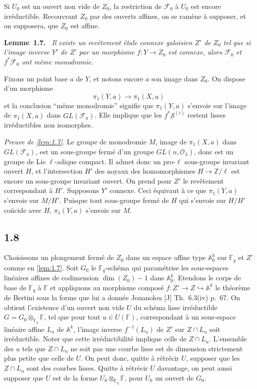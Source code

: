 \documentclass[10pt,a4paper]{article}
\makeatletter
\theoremstyle{plain}
\theoremstyle{definition}
\newenvironment{manualblock}[4]{%
  \par\medskip\noindent\textbf{#1~#2#3.}\def\@currentlabel{#2}\label{#4}\itshape\ }{\par\normalfont\medskip}
\makeatother
\begin{document}
Si $U_0$ est un ouvert non vide de $Z_0$, la restriction de $\mathcal{F}_0$ \`a $U_0$ est encore irr\'eductible. Recouvrant $Z_0$ par des ouverts affines, on se ram\`ene \`a supposer, et on supposera, que $Z_0$ est affine.

\begin{manualblock}{Lemme}{1.7}{}{lem:1.7}
Il existe un rev\^etement \'etale connexe galoisien $Z'$ de $Z_0$ tel que si l'image inverse $Y'$ de $Z'$ par un morphisme $f: Y \to Z_0$ est connexe, alors $\mathcal{F}_0$ et $f^* \mathcal{F}_0$ ont m\^eme monodromie.
\end{manualblock}

Fixons un point base $a$ de $Y$, et notons encore $a$ son image dans $Z_0$. On dispose d'un morphisme
\[
\pi_1(Y,a) \to \pi_1(X,a)
\]
et la conclusion ``m\^eme monodromie'' signifie que $\pi_1(Y,a)$ s'envoie sur l'image de $\pi_1(X,a)$ dans $GL(\mathcal{F}_a)$. Elle implique que les $f^* \mathcal{S}^{(i)}$ restent lisses irr\'eductibles non isomorphes.

\noindent\textit{Preuve de \ref{lem:1.7}.} Le groupe de monodromie $M$, image de $\pi_1(X,a)$ dans $GL(\mathcal{F}_a)$, est un sous-groupe ferm\'e d'un groupe $GL(n, \mathcal{O}_\lambda)$, donc est un groupe de Lie $\ell$-adique compact. Il admet donc un pro-$\ell$ sous-groupe invariant ouvert $H$, et l'intersection $H'$ des noyaux des homomorphismes $H \to \mathbb{Z}/\ell$ est encore un sous-groupe invariant ouvert. On prend pour $Z'$ le rev\^etement correspondant \`a $H'$. Supposons $Y'$ connexe. Ceci \'equivaut \`a ce que $\pi_1(Y,a)$ s'envoie sur $M/H'$. Puisque tout sous-groupe ferm\'e de $H$ qui s'envoie sur $H/H'$ co\"ncide avec $H$, $\pi_1(Y,a)$ s'envoie sur $M$.

\subsection*{1.8}

Choisissons un plongement ferm\'e de $Z_0$ dans un espace affine type $\mathbb{A}_0^{k}$ sur $\mathbb{F}_q$ et $Z'$ comme en \ref{lem:1.7}. Soit $G_0$ le $\mathbb{F}_q$-sch\'ema qui param\'etrise les sous-espaces lin\'eaires affines de codimension $\dim(Z_0)-1$ dans $\mathbb{A}_0^{k}$. Etendons le corps de base de $\mathbb{F}_q$ \`a $\mathbb{F}$ et appliquons au morphisme compos\'e $f: Z' \to Z \hookrightarrow \mathbb{A}^{k}$ le th\'eor\`eme de Bertini sous la forme que lui a donn\'ee Jouanolou [J] Th.~6.3(iv) p.~67. On obtient l'existence d'un ouvert non vide $U$ du sch\'ema lisse irr\'eductible $G = G_0 \otimes_{\mathbb{F}_q} \mathbb{F}$, tel que pour tout $u \in U(\mathbb{F})$, correspondant \`a un sous-espace lin\'eaire affine $L_u$ de $\mathbb{A}^{k}$, l'image inverse $f^{-1}(L_u)$ de $Z'$ sur $Z \cap L_u$ soit irr\'eductible. Noter que cette irr\'eductibilit\'e implique celle de $Z \cap L_u$. L'ensemble des $u$ tels que $Z \cap L_u$ ne soit pas une courbe lisse est de dimension strictement plus petite que celle de $U$. On peut donc, quitte \`a r\'etr\'ecir $U$, supposer que les $Z \cap L_u$ sont des courbes lisses. Quitte \`a r\'etr\'ecir $U$ davantage, on peut aussi supposer que $U$ est de la forme $U_0 \otimes_{\mathbb{F}_q} \mathbb{F}$, pour $U_0$ un ouvert de $G_0$.
\end{document}
